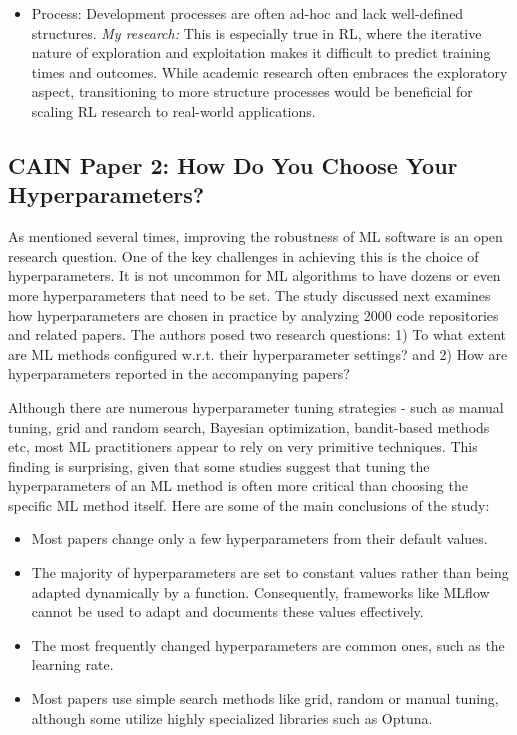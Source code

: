 \documentclass[11pt]{article}
\begin{document}
\begin{itemize}
    \item Process: Development processes are often ad-hoc and lack well-defined structures. \textit{My research:} This is especially true in RL, where the iterative nature of exploration and exploitation makes it difficult to predict training times and outcomes. While academic research often embraces the exploratory aspect, transitioning to more structure processes would be beneficial for scaling RL research to real-world applications.
\end{itemize}








\subsection*{CAIN Paper 2: How Do You Choose Your Hyperparameters? \cite{simon2023exploring}}
As mentioned several times, improving the robustness of ML software is an open research question. One of the key challenges in achieving this is the choice of hyperparameters. It is not uncommon for ML algorithms to have dozens or even more hyperparameters that need to be set. The study discussed next examines how hyperparameters are chosen in practice by analyzing 2000 code repositories and related papers. The authors posed two research questions: 1) To what extent are ML methods configured w.r.t. their hyperparameter settings? and 2) How are hyperparameters reported in the accompanying papers?

Although there are numerous hyperparameter tuning strategies - such as manual tuning, grid and random search, Bayesian optimization, bandit-based methods etc, most ML practitioners appear to rely on very primitive techniques. This finding is surprising, given that some studies suggest that tuning the hyperparameters of an ML method is often more critical than choosing the specific ML method itself. Here are some of the main conclusions of the study:

\begin{itemize}
    \item Most papers change only a few hyperparameters from their default values.
    \item The majority of hyperparameters are set to constant values rather than being adapted dynamically by a function. Consequently, frameworks like MLflow cannot be used  to adapt and documents these values effectively. 
    \item The most frequently changed hyperparameters are common ones, such as the learning rate.
    \item Most papers use simple search methods like grid, random or manual tuning, although some utilize highly specialized libraries such as Optuna. 
\end{itemize}
\end{document}
